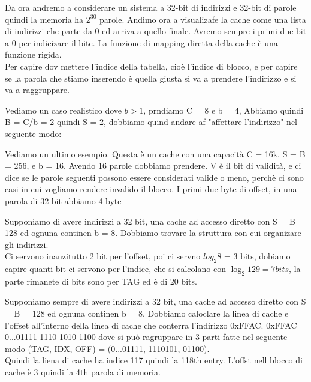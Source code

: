Da ora andremo a considerare un sistema a 32-bit di indirizzi e 32-bit di parole quindi la memoria ha \(2^{30}\) parole.
Andimo ora a visualizafe la cache come una lista di indirizzi che parte da 0 ed arriva a quello finale. Avremo sempre i primi due bit a 0 per indicizare il bite.
La funzione di mapping diretta della cache è una funzione rigida.\\


Per capire dov mettere l'indice della tabella, cioè l'indice di blocco, e per capire se la parola che stiamo inserendo è quella giusta si va a prendere l'indirizzo e si va a
raggruppare.


Vediamo un caso realistico dove \(b > 1\), prndiamo C = 8 e b = 4, Abbiamo quindi B = C/b = 2 quindi S = 2, dobbiamo quind andare af "affettare l'indirizzo" nel seguente modo:

Vediamo un ultimo esempio. Questa è un cache  con una capacità C = 16k, S = B = 256, e b = 16. Avendo 16 parole dobbiamo prendere. V è il bit di validità, e ci dice se le parole seguenti
possono essere considerati valide o meno, perchè ci sono casi in cui vogliamo rendere invalido il blocco. I primi due byte di offset, in una parola di 32 bit abbiamo 4 byte 

\begin{example}
    Supponiamo di avere indirizzi a 32 bit, una cache ad accesso diretto con S = B = 128 ed ognuna continen b = 8. Dobbiamo trovare la struttura con cui organizare gli indirizzi.\\
    Ci servono inanzitutto 2 bit per l'offset, poi ci servno \(log_2 8\) = 3 bits, dobiamo capire quanti bit ci servono per l'indice, che si calcolano con \(\log_2 129 = 7 bits\), la parte rimanete
    di bits sono per TAG ed è di 20 bits.
\end{example}

\begin{example}
    Supponiamo sempre di avere indirizzi a 32 bit, una cache ad accesso diretto con S = B = 128 ed ognuna continen b = 8. Dobbiamo caloclare la linea di cache e l'offset all'interno della linea
    di cache che conterra l'indirizzo 0xFFAC. 0xFFAC = 0...01111 1110 1010 1100 dove si può ragruppare in 3 parti fatte nel seguente modo (TAG, IDX, OFF) = (0...01111, 1110101, 01100). \\
    Quindi la liena di cache ha indice 117 quindi la 118th entry. L'offst nell blocco di cache è 3 quindi la 4th parola di memoria.
\end{example}

